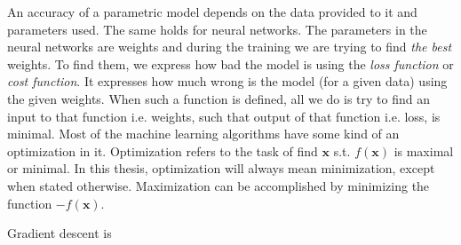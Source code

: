 An accuracy of a parametric model depends on the data provided to it and  parameters used. The same holds for neural networks. The parameters in the neural networks are weights and during the training we are trying to find \textit{the best} weights. To find them, we express how bad the model is using the \textit{loss function} or \textit{cost function}. It expresses how much wrong is the model (for a given data) using the given weights. When such a function is defined, all we do is try to find an input to that function i.e. weights, such that output of that function i.e. loss, is minimal. Most of the machine learning algorithms have some kind of an optimization in it. Optimization refers to the task of find $\pmb x$ s.t. $f(\pmb x)$ is maximal or minimal. In this thesis, optimization will always mean minimization, except when stated otherwise. Maximization can be accomplished by minimizing the function $-f(\pmb x)$.

Gradient descent is 
